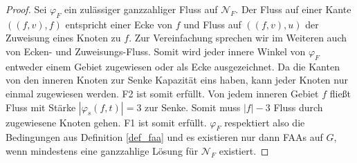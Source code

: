 \begin{proof}
Sei $\varphi_F$ ein zulässiger ganzzahliger Fluss auf $\mathcal{N}_F$. Der Fluss auf einer Kante $((f,v),f)$ entspricht einer Ecke von $f$ und Fluss auf $((f,v),u)$ der Zuweisung eines Knoten zu $f$. Zur Vereinfachung sprechen wir im Weiteren auch von Ecken- und Zuweisungs-Fluss. Somit wird jeder innere Winkel von $\varphi_F$ entweder einem Gebiet zugewiesen oder als Ecke ausgezeichnet. Da die Kanten von den inneren Knoten zur Senke Kapazität eins haben, kann jeder Knoten nur einmal zugewiesen werden. F2 ist somit erfüllt. Von jedem inneren Gebiet $f$ fließt Fluss mit Stärke $|\varphi_s(f,t)| = 3$ zur Senke. Somit muss $|f|-3$ Fluss durch zugewiesene Knoten gehen. F1 ist somit erfüllt. $\varphi_F$ respektiert also die Bedingungen aus Definition \ref{def_faa} und es existieren nur dann FAAs auf $G$, wenn mindestens eine ganzzahlige Lösung für $\mathcal{N}_F$ existiert.
\end{proof}

